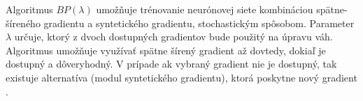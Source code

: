 Algoritmus $BP(\lambda)$ umožňuje trénovanie neurónovej siete kombináciou spätne-šíreného gradientu a syntetického gradientu, stochastickým spôsobom. Parameter $\lambda$ určuje, ktorý z dvoch dostupných gradientov bude použitý na úpravu váh. Algoritmus umožňuje využívať spätne šírený gradient až dovtedy, dokiaľ je dostupný a dôveryhodný. V prípade ak vybraný gradient nie je dostupný, tak existuje alternatíva (modul syntetického gradientu), ktorá poskytne nový gradient \cite{Jaderberg2016}.


